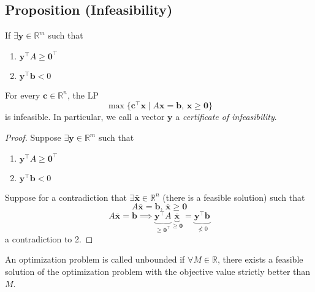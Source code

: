 \subsection{Proposition (Infeasibility)}
If
$\exists \mathbf{y}\in\mathbb{R}^m$ such that
\begin{enumerate}
    \item $\mathbf{y}^\top A\ge\mathbf{0}^\top $
    \item $\mathbf{y}^\top \mathbf{b}<0$
\end{enumerate}
For every $\mathbf{c}\in\mathbb{R}^n$, the LP
\[\max \{\mathbf{c}^\top \mathbf{x} \mid A\mathbf{x}=\mathbf{b}\text{, }
\mathbf{x}\ge\mathbf{0}\}\]
is infeasible. In particular, we call a vector $\mathbf{y}$ a \emph{certificate of infeasibility}.

\begin{proof}
    Suppose $\exists \mathbf{y}\in\mathbb{R}^m$ such that
\begin{enumerate}
    \item $\mathbf{y}^\top A\ge\mathbf{0}^\top $
    \item $\mathbf{y}^\top \mathbf{b}<0$
\end{enumerate}
Suppose for a contradiction that $\exists\mathbf{\bar{x}}\in\mathbb{R}^n$ 
(there is a feasible solution)
such that
\[A\mathbf{\bar{x}}=\mathbf{b} \text{, }\mathbf{\bar{x}}\ge \mathbf{0}\]
\[
    A\mathbf{\bar{x}}=\mathbf{b}
    \implies
    \underbrace{\mathbf{y}^\top A}_{\ge\mathbf{0}^\top }
    \underbrace{\mathbf{\bar{x}}}_{\ge\mathbf{0}}
    =\underbrace{\mathbf{y}^\top \mathbf{b}}_{\nless 0}
\]
a contradiction to 2.
\end{proof}

An optimization problem is called unbounded if $\forall M\in\mathbb{R}$, there
exists a feasible solution of the optimization problem with the objective 
value strictly better than $M$.
